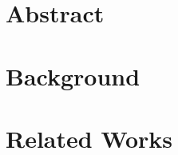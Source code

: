 \documentclass[11pt]{article}
\begin{document}
    \tableofcontents
    \newpage
    \resetPageNumbering

    

    \newpage
    \chapter{Abstract}
    

    \newpage
    \chapter{Background}
    

    \newpage
    \chapter{Related Works}
    
    
\end{document}
